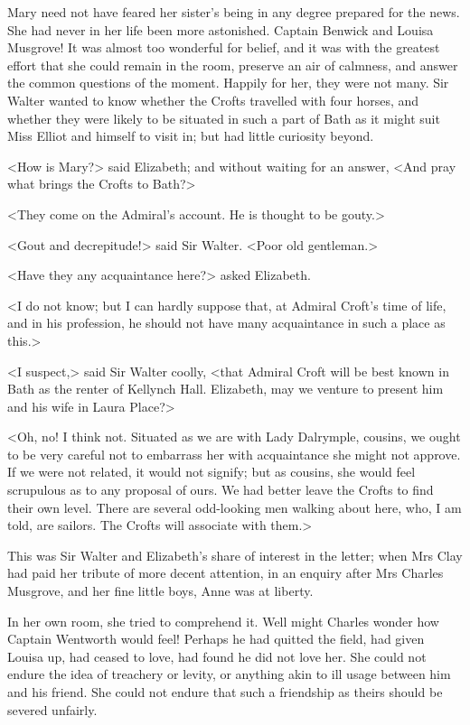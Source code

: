 Mary need not have feared her sister's being in any degree prepared for the news. She had never in her life been more astonished. Captain Benwick and Louisa Musgrove! It was almost too wonderful for belief, and it was with the greatest effort that she could remain in the room, preserve an air of calmness, and answer the common questions of the moment. Happily for her, they were not many. Sir Walter wanted to know whether the Crofts travelled with four horses, and whether they were likely to be situated in such a part of Bath as it might suit Miss Elliot and himself to visit in; but had little curiosity beyond.

<How is Mary?> said Elizabeth; and without waiting for an answer, <And pray what brings the Crofts to Bath?>

<They come on the Admiral's account. He is thought to be gouty.>

<Gout and decrepitude!> said Sir Walter. <Poor old gentleman.>

<Have they any acquaintance here?> asked Elizabeth.

<I do not know; but I can hardly suppose that, at Admiral Croft's time of life, and in his profession, he should not have many acquaintance in such a place as this.>

<I suspect,> said Sir Walter coolly, <that Admiral Croft will be best known in Bath as the renter of Kellynch Hall. Elizabeth, may we venture to present him and his wife in Laura Place?>

<Oh, no! I think not. Situated as we are with Lady Dalrymple, cousins, we ought to be very careful not to embarrass her with acquaintance she might not approve. If we were not related, it would not signify; but as cousins, she would feel scrupulous as to any proposal of ours. We had better leave the Crofts to find their own level. There are several odd-looking men walking about here, who, I am told, are sailors. The Crofts will associate with them.>

This was Sir Walter and Elizabeth's share of interest in the letter; when Mrs Clay had paid her tribute of more decent attention, in an enquiry after Mrs Charles Musgrove, and her fine little boys, Anne was at liberty.

In her own room, she tried to comprehend it. Well might Charles wonder how Captain Wentworth would feel! Perhaps he had quitted the field, had given Louisa up, had ceased to love, had found he did not love her. She could not endure the idea of treachery or levity, or anything akin to ill usage between him and his friend. She could not endure that such a friendship as theirs should be severed unfairly.


